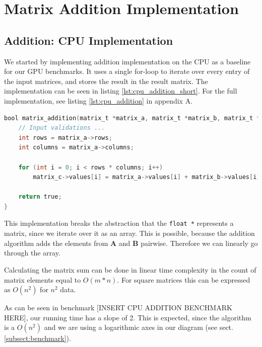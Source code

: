\section{Matrix Addition Implementation}

\subsection{Addition: CPU Implementation}

We started by implementing addition implementation on the CPU as a baseline for our GPU benchmarks. It uses a single for-loop to iterate over every entry of the input matrices, and stores the result in the result matrix. The implementation can be seen in listing \ref{lst:cpu_addition_short}. For the full implementation, see listing \ref{lst:cpu_addition} in appendix A. 


\begin{lstlisting}[language=C, caption={CPU addition algorithm}, label={lst:cpu_addition_short}]
bool matrix_addition(matrix_t *matrix_a, matrix_t *matrix_b, matrix_t *matrix_c) {
    // Input validations ...
    int rows = matrix_a->rows;
    int columns = matrix_a->columns;

    for (int i = 0; i < rows * columns; i++)
        matrix_c->values[i] = matrix_a->values[i] + matrix_b->values[i];

    return true;
}
\end{lstlisting}

This implementation breaks the abstraction that the \texttt{float *} represents a matrix, since we iterate over it as an array. This is possible, because the addition algorithm adds the elements from $\mathbf{A}$ and $\mathbf{B}$ pairwise. Therefore we can linearly go through the array.

Calculating the matrix sum can be done in linear time complexity in the count of matrix elements equal to $O(m * n)$. For square matrices this can be expressed as $O(n^2)$ for $n^2$ data. 

 As can be seen in benchmark [INSERT CPU ADDITION BENCHMARK HERE], our running time has a slope of 2. This is expected, since the algorithm is a $O(n^2)$ and we are using a logarithmic axes in our diagram (see sect. \ref{subsect:benchmark}).

